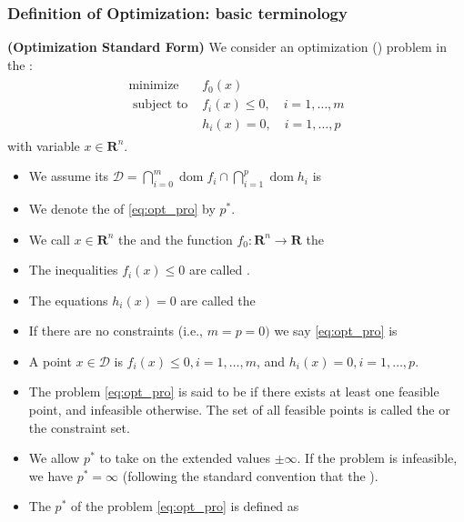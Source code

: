 \documentclass{article}
\newcommand{\bfs}[1]{\textbf{({#1}) }}
\begin{document}
\subsubsection{Definition of Optimization: basic terminology}
\begin{defa}\bfs{Optimization Standard Form}
We consider an optimization () problem in the :
\begin{align}
\begin{array}{ll}
\operatorname{minimize} & f_{0}(x) \\
\text { subject to } & f_{i}(x) \leq 0, \quad i=1, \ldots, m \\
& h_{i}(x)=0, \quad i=1, \ldots, p
\end{array}\label{eq:opt_pro}
\end{align}
with variable $x \in \mathbf{R}^{n}$.
\begin{itemize}
    \item We assume its  $\mathcal{D}=\bigcap_{i=0}^{m} \operatorname{dom} f_{i} \cap \bigcap_{i=1}^{p} \operatorname{dom} h_{i}$ is 
    \item We denote the  of \cref{eq:opt_pro} by $p^* $.
    \item We call $x \in \mathbf{R}^{n}$ the  and the function $f_{0}: \mathbf{R}^{n} \rightarrow \mathbf{R}$ the 
    \item The inequalities $f_{i}(x) \leq 0$ are called .
    \item The equations $h_{i}(x)=0$ are called the 
    \item If there are no constraints (i.e., $m=p=0)$ we say \cref{eq:opt_pro} is 
    \item A point $x \in \mathcal{D}$ is  $f_{i}(x) \leq 0, i=1, \ldots, m$, and $h_{i}(x)=0, i=1, \ldots, p$.
    \item The problem \cref{eq:opt_pro} is said to be  if there exists at least one feasible point, and infeasible otherwise. The set of all feasible points is called the  or the constraint set.
    \item We allow $p^* $ to take on the extended values $\pm \infty$. If the problem is infeasible, we have $p^* =\infty$ (following the standard convention that the  ). 
    \item The  $p^* $ of the problem \cref{eq:opt_pro} is defined as

\end{itemize}
\end{defa}
\end{document}
